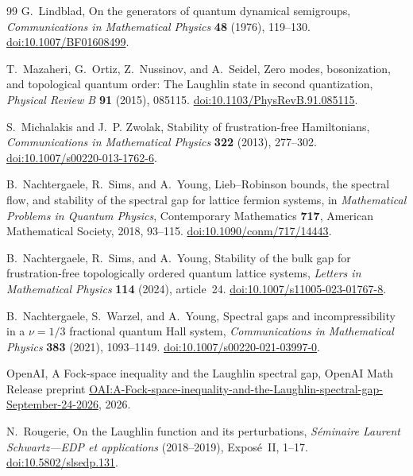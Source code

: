 \begin{thebibliography}{99}
G.~Lindblad,
On the generators of quantum dynamical semigroups,
\emph{Communications in Mathematical Physics} \textbf{48} (1976), 119--130.
\href{https://doi.org/10.1007/BF01608499}{doi:10.1007/BF01608499}.

T.~Mazaheri, G.~Ortiz, Z.~Nussinov, and A.~Seidel,
Zero modes, bosonization, and topological quantum order:
The Laughlin state in second quantization,
\emph{Physical Review B} \textbf{91} (2015), 085115.
\href{https://doi.org/10.1103/PhysRevB.91.085115}{doi:10.1103/PhysRevB.91.085115}.

S.~Michalakis and J.~P. Zwolak,
Stability of frustration-free Hamiltonians,
\emph{Communications in Mathematical Physics} \textbf{322} (2013), 277--302.
\href{https://doi.org/10.1007/s00220-013-1762-6}{doi:10.1007/s00220-013-1762-6}.

B.~Nachtergaele, R.~Sims, and A.~Young,
Lieb--Robinson bounds, the spectral flow, and stability of the spectral gap
for lattice fermion systems,
in \emph{Mathematical Problems in Quantum Physics},
Contemporary Mathematics \textbf{717}, American Mathematical Society, 2018,
93--115.
\href{https://doi.org/10.1090/conm/717/14443}{doi:10.1090/conm/717/14443}.

B.~Nachtergaele, R.~Sims, and A.~Young,
Stability of the bulk gap for frustration-free topologically ordered
quantum lattice systems,
\emph{Letters in Mathematical Physics} \textbf{114} (2024), article~24.
\href{https://doi.org/10.1007/s11005-023-01767-8}{doi:10.1007/s11005-023-01767-8}.

B.~Nachtergaele, S.~Warzel, and A.~Young,
Spectral gaps and incompressibility in a $\nu=1/3$ fractional quantum Hall system,
\emph{Communications in Mathematical Physics} \textbf{383} (2021), 1093--1149.
\href{https://doi.org/10.1007/s00220-021-03997-0}{doi:10.1007/s00220-021-03997-0}.

OpenAI,
A Fock-space inequality and the Laughlin spectral gap,
OpenAI Math Release preprint
\href{https://github.com/openai/math/blob/main/preprints/A-Fock-space-inequality-and-the-Laughlin-spectral-gap-September-24-2026/A-Fock-space-inequality-and-the-Laughlin-spectral-gap-September-24-2026.pdf}{OAI:A-Fock-space-inequality-and-the-Laughlin-spectral-gap-September-24-2026},
2026.

N.~Rougerie,
On the Laughlin function and its perturbations,
\emph{S\'eminaire Laurent Schwartz---EDP et applications} (2018--2019),
Expos\'e~II, 1--17.
\href{https://doi.org/10.5802/slsedp.131}{doi:10.5802/slsedp.131}.


\end{thebibliography}
